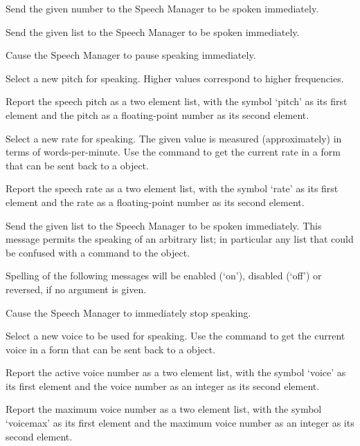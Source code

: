   Send the given number to the Speech Manager to be spoken immediately.
  
  Send the given list to the Speech Manager to be spoken immediately.
  
  Cause the Speech Manager to pause speaking immediately.
  
  Select a new pitch for speaking.
  Higher values correspond to higher frequencies.
  
  Report the speech pitch as a two element list, with the symbol `pitch' as its first element and
  the pitch as a floating-point number as its second element.
  
  Select a new rate for speaking.
  The given value is measured (approximately) in terms of words-per-minute.
  Use the  command to get the current rate in a form that can be sent back to a
   object.
  
  Report the speech rate as a two element list, with the symbol `rate' as its first element and
  the rate as a floating-point number as its second element.
 
  Send the given list to the Speech Manager to be spoken immediately.
  This message permits the speaking of an arbitrary list; in particular any list that could be
  confused with a command to the  object.
  
  Spelling of the following messages will be enabled (`on'), disabled (`off') or reversed, if no argument is given.
  
  Cause the Speech Manager to immediately stop speaking.
  
  Select a new voice to be used for speaking.
  Use the  command to get the current voice in a form that can be sent back to a
   object.
  
  Report the active voice number as a two element list, with the symbol `voice' as its first element and
  the voice number as an integer as its second element.
  
  Report the maximum voice number as a two element list, with the symbol `voicemax' as its first element and
  the maximum voice number as an integer as its second element.
  

